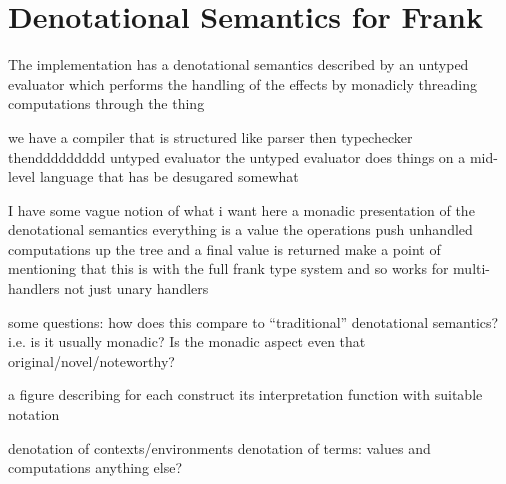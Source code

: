 \section{Denotational Semantics for Frank}
\label{sec:denote}

The implementation has a denotational semantics described by an untyped
evaluator which performs the handling of the effects by monadicly threading
computations through the thing

we have a compiler that is structured like parser then typechecker
thenddddddddd untyped evaluator the untyped evaluator does things on a
mid-level language that has be desugared somewhat

I have some vague notion of what i want here a monadic presentation of the
denotational semantics everything is a value the operations push unhandled
computations up the tree and a final value is returned make a point of
mentioning that this is with the full frank type system and so works for
multi-handlers not just unary handlers

some questions: how does this compare to ``traditional'' denotational
semantics? i.e. is it usually monadic? Is the monadic aspect even that
original/novel/noteworthy?

a figure describing for each construct its interpretation function with
suitable notation

denotation of contexts/environments
denotation of terms: values and computations
anything else?

